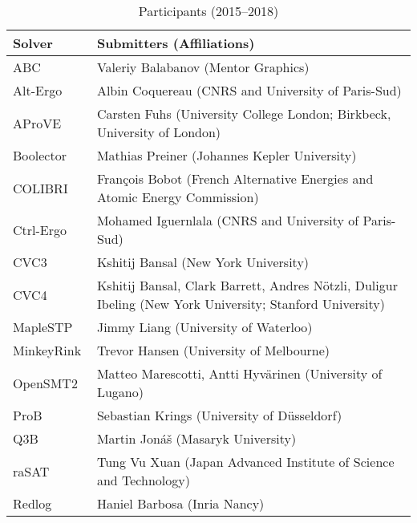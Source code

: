 \documentclass[twoside,11pt]{article}
\begin{document}
\begin{table}
  \caption{Participants (2015--2018)}
  \label{table:participants}
  \centering
  \begin{tabular}{|l|p{11.5cm}|}
    \hline
    Solver & Submitters (Affiliations)\\
    \hline
    ABC~\cite{DBLP:conf/cav/BraytonM10} & Valeriy Balabanov
                        (Mentor Graphics)\\
    Alt-Ergo          & Albin Coquereau
                        (CNRS and University of Paris-Sud)\\
    AProVE~\cite{DBLP:conf/cade/GieslBEFFOPSSST14} & Carsten Fuhs
                        (University College London; Birkbeck, University of London)\\
    Boolector~\cite{DBLP:conf/cav/NiemetzPWB18} & Mathias Preiner
                        (Johannes Kepler University)\\
    COLIBRI~\cite{colibri} & Fran\c{c}ois Bobot
                        (French Alternative Energies and Atomic Energy Commission)\\
    Ctrl-Ergo         & Mohamed Iguernlala
                        (CNRS and University of Paris-Sud)\\
    CVC3~\cite{DBLP:conf/cav/BarrettT07} & Kshitij Bansal
                        (New York University)\\
    CVC4~\cite{DBLP:conf/cav/BarrettCDHJKRT11}  & Kshitij Bansal, Clark Barrett, Andres N\"otzli, Duligur Ibeling
                        (New York University; Stanford University)\\
    MapleSTP          & Jimmy Liang
                        (University of Waterloo)\\
    MinkeyRink        & Trevor Hansen
                        (University of Melbourne)\\
    OpenSMT2~\cite{DBLP:conf/sat/HyvarinenMAS16} & Matteo Marescotti, Antti Hyv\"arinen
                        (University of Lugano)\\
    ProB~\cite{doi:10.1002/9781119002727.ch14} & Sebastian Krings
                        (University of D\"usseldorf)\\
    Q3B               & Martin Jon\'a\v{s}
                        (Masaryk University)\\
    raSAT~\cite{rasat} & Tung Vu Xuan
                        (Japan Advanced Institute of Science and Technology)\\
    Redlog~\cite{DBLP:journals/cca/Dolzmann097} & Haniel Barbosa
                        (Inria Nancy)\\

\end{tabular}
\end{table}
\end{document}
